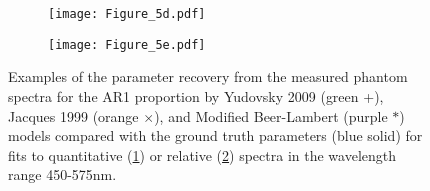 \begin{figure}[htbp]
    \centering
    \begin{subfigure}{0.8\textwidth}
        \texttt{[image: Figure\_5d.pdf]}
        \caption{}
        \label{fig:phantomAR1quant}
    \end{subfigure}
    \begin{subfigure}{0.8\textwidth}
        \texttt{[image: Figure\_5e.pdf]}
        \caption{}
        \label{fig:phantomAR1norm}
    \end{subfigure}
    \caption{Examples of the parameter recovery from the measured phantom spectra for the AR1 proportion by Yudovsky 2009 (\textcolor{MyGreen}{green +}), Jacques 1999 (\textcolor{MyOrange}{orange $\times$)}, and Modified Beer-Lambert (\textcolor{MyPurple}{purple $*$}) models compared with the ground truth parameters (\textcolor{MyBlue}{blue solid}) for fits to quantitative (\ref{fig:phantomAR1quant}) or relative (\ref{fig:phantomAR1norm}) spectra in the wavelength range 450-575nm.}
    \label{fig:singlegelatinforwards}
\end{figure}

